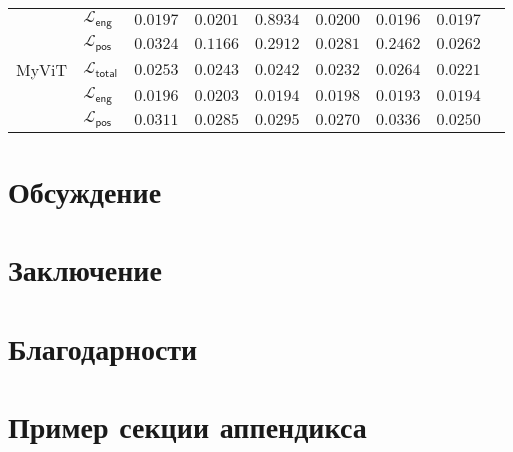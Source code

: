 \documentclass[a4paper,12pt]{extarticle}
\begin{document}
\begin{table}[ht]
\begin{tabular}{llrrrrrrr}
        {} & $\mathcal{L}_{\mathsf{eng}}$ & $\mathsf{0.0197}$ & $\mathsf{0.0201}$ & $\mathsf{0.8934}$ & $\mathsf{0.0200}$ & $\mathsf{0.0196}$ & $\mathsf{0.0197}$ \\
        {} & $\mathcal{L}_{\mathsf{pos}}$ & $\mathsf{0.0324}$ & $\mathsf{0.1166}$ & $\mathsf{0.2912}$ & $\mathsf{0.0281}$ & $\mathsf{0.2462}$ & $\mathsf{0.0262}$ \\
        \midrule
        \textsf{MyViT} & $\mathcal{L}_{\mathsf{total}}$ & $\mathsf{0.0253}$ & $\mathsf{0.0243}$ & $\mathsf{0.0242}$ & $\mathsf{0.0232}$ & $\mathsf{0.0264}$ & $\mathsf{0.0221}$ \\
        {} & $\mathcal{L}_{\mathsf{eng}}$ & $\mathsf{0.0196}$ & $\mathsf{0.0203}$ & $\mathsf{0.0194}$ & $\mathsf{0.0198}$ & $\mathsf{0.0193}$ & $\mathsf{0.0194}$ \\
        {} & $\mathcal{L}_{\mathsf{pos}}$ & $\mathsf{0.0311}$ & $\mathsf{0.0285}$ & $\mathsf{0.0295}$ & $\mathsf{0.0270}$ & $\mathsf{0.0336}$ & $\mathsf{0.0250}$ \\
        
		\bottomrule
	\end{tabular}

    \caption{}
	\label{table:all_models}
\end{table}

\section{Обсуждение}

\section{Заключение}

\section{Благодарности}

\newpage 
\printbibliography[heading=bibintoc] 


\newpage
\appendix

\section{Пример секции аппендикса}
\end{document}
